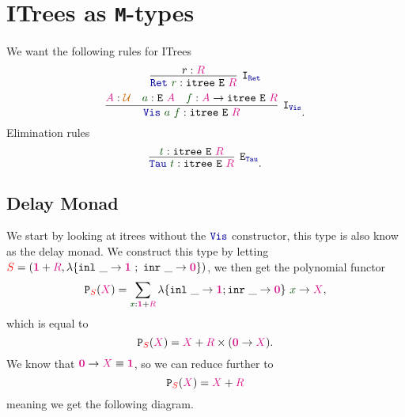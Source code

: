 \documentclass[twoside,11pt,openright]{report}
\theoremstyle{plain} %
\theoremstyle{definition}
\theoremstyle{remark}
\newcommand*{\term}[1]{\textcolor{green!30!black}{#1}} %
\newcommand*{\type}[1]{\textcolor{magenta!90!black}{#1}}
\newcommand*{\container}[1]{\textcolor{red}{#1}}
\newcommand*{\universe}[1]{\textcolor{orange!80!black}{#1}}
\newcommand*{\unit}{\type{\textbf{1}}}
\newcommand*{\empt}{\type{\textbf{0}}}
\newcommand*{\function}[1]{\textcolor{blue!60!black}{\ensuremath{\mathtt{#1}}}}
\newcommand*{\typeformer}[1]{\ensuremath{\mathtt{#1}}}
\newcommand*{\functor}[1]{\ensuremath{\mathbf{\mathtt{#1}}}}
\begin{document}
\section{ITrees as \texttt{M}-types}
We want the following rules for ITrees
\begin{equation}
  \infer[\mathtt{I}_{\function{Ret}}]{\function{Ret}~\term{r} : \typeformer{itree}~\typeformer{E}~\type{R}}{r : \type{R}}
\end{equation}
\begin{equation}
  \infer[\mathtt{I}_{\function{Vis}}]{\function{Vis}~\term{a}~\term{f} : \typeformer{itree}~\typeformer{E}~\type{R}}{\type{A} : \universe{\mathcal{U}} & \term{a} : \typeformer{E}~\type{A} & \term{f} : \type{A} \rightarrow \typeformer{itree}~\typeformer{E}~\type{R}}.
\end{equation}
Elimination rules
\begin{equation}
  \infer[\mathtt{E}_{\function{Tau}}]{\function{Tau}~\term{t} : \typeformer{itree}~\typeformer{E}~\type{R}}{\term{t} : \typeformer{itree}~\typeformer{E}~\type{R}}.
\end{equation}

\subsection{Delay Monad}
We start by looking at itrees without the \(\function{Vis}\) constructor, this type is also know as the delay monad. We construct this type by letting \(\container{S} = (\unit + \type{R},\lambda \{ \texttt{inl}~\_ \rightarrow \unit~;~\texttt{inr}~\_ \rightarrow \empt \})\), we then get the polynomial functor
\begin{equation}
  \functor{P}_{\container{S}}(\type{X}) = \sum_{\term{x} : \unit + \type{R}} \lambda \{ \texttt{inl}~\_ \rightarrow \unit ; \texttt{inr}~\_ \rightarrow \empt\}~\term{x} \rightarrow \type{X},
\end{equation}
which is equal to
\begin{equation}
  \functor{P}_{\container{S}}(\type{X}) = \type{X} + \type{R} \times (\empt \rightarrow \type{X}).
\end{equation}
We know that \(\empt \rightarrow \type{X} \equiv \unit\), so we can reduce further to
\begin{equation}
  \functor{P}_{\container{S}}(\type{X}) = \type{X} + \type{R}
\end{equation}
meaning we get the following diagram.
\end{document}
